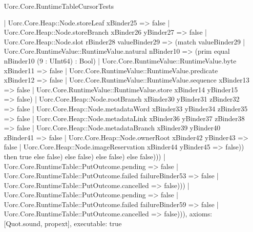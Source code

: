 \begin{lexlean}{Uorc.Core.RuntimeTableCursorTests}
\begin{semanticmodule}
{                      | Uorc.Core.Heap::Node.storeLeaf xBinder25 => false
                      | Uorc.Core.Heap::Node.storeBranch xBinder26 yBinder27 => false
                      | Uorc.Core.Heap::Node.slot rBinder28 valueBinder29 => (match valueBinder29
                        | Uorc.Core.RuntimeValue::RuntimeValue.natural nBinder10 => (prim equal nBinder10 (9 : UInt64) : Bool)
                        | Uorc.Core.RuntimeValue::RuntimeValue.byte xBinder11 => false
                        | Uorc.Core.RuntimeValue::RuntimeValue.predicate xBinder12 => false
                        | Uorc.Core.RuntimeValue::RuntimeValue.sequence xBinder13 => false
                        | Uorc.Core.RuntimeValue::RuntimeValue.store xBinder14 yBinder15 => false)
                      | Uorc.Core.Heap::Node.rootBranch xBinder30 yBinder31 zBinder32 => false
                      | Uorc.Core.Heap::Node.metadataWord xBinder33 yBinder34 zBinder35 => false
                      | Uorc.Core.Heap::Node.metadataLink xBinder36 yBinder37 zBinder38 => false
                      | Uorc.Core.Heap::Node.metadataBranch xBinder39 yBinder40 zBinder41 => false
                      | Uorc.Core.Heap::Node.ownerRoot xBinder42 yBinder43 => false
                      | Uorc.Core.Heap::Node.imageReservation xBinder44 yBinder45 => false)) then true else false) else false) else false) else false)))
              | Uorc.Core.RuntimeTable::PutOutcome.pending => false
              | Uorc.Core.RuntimeTable::PutOutcome.failed failureBinder53 => false
              | Uorc.Core.RuntimeTable::PutOutcome.cancelled => false)))
        | Uorc.Core.RuntimeTable::PutOutcome.pending => false
        | Uorc.Core.RuntimeTable::PutOutcome.failed failureBinder59 => false
        | Uorc.Core.RuntimeTable::PutOutcome.cancelled => false))),
  axioms: [Quot.sound, propext],
  executable: true
}


\end{semanticmodule}
\end{lexlean}
